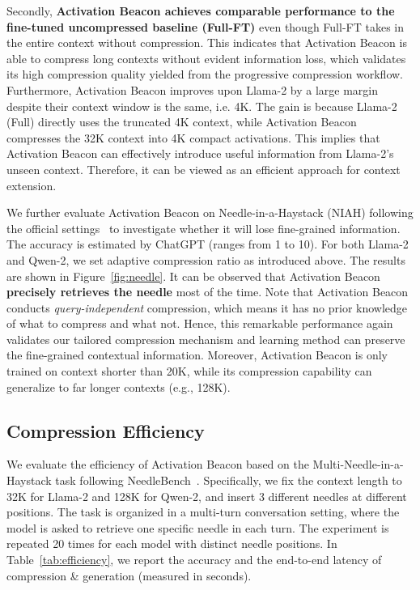 Secondly, \textbf{Activation Beacon achieves comparable performance to the fine-tuned uncompressed baseline (Full-FT)} even though Full-FT takes in the entire context without compression. This indicates that Activation Beacon is able to compress long contexts without evident information loss, which validates its high compression quality yielded from the progressive compression workflow. Furthermore, Activation Beacon improves upon Llama-2 by a large margin despite their context window is the same, i.e. 4K. The gain is because Llama-2 (Full) directly uses the truncated 4K context, while Activation Beacon compresses the 32K context into 4K compact activations. This implies that Activation Beacon can effectively introduce useful information from Llama-2's unseen context. Therefore, it can be viewed as an efficient approach for context extension.

We further evaluate Activation Beacon on Needle-in-a-Haystack (NIAH) following the official settings~\citep{niah} to investigate whether it will lose fine-grained information. The accuracy is estimated by ChatGPT (ranges from 1 to 10). For both Llama-2 and Qwen-2, we set adaptive compression ratio as introduced above. The results are shown in Figure~\ref{fig:needle}. It can be observed that Activation Beacon \textbf{precisely retrieves the needle} most of the time. Note that Activation Beacon conducts \textit{query-independent} compression, which means it has no prior knowledge of what to compress and what not. Hence, this remarkable performance again validates our tailored compression mechanism and learning method can preserve the fine-grained contextual information. Moreover, Activation Beacon is only trained on context shorter than 20K, while its compression capability can generalize to far longer contexts (e.g., 128K). 

\subsection{Compression Efficiency}
\label{sec:exp-efficiency}

We evaluate the efficiency of Activation Beacon based on the Multi-Needle-in-a-Haystack task following NeedleBench~\citep{li2024needlebench}. Specifically, we fix the context length to 32K for Llama-2 and 128K for Qwen-2, and insert 3 different needles at different positions. The task is organized in a multi-turn conversation setting, where the model is asked to retrieve one specific needle in each turn. The experiment is repeated 20 times for each model with distinct needle positions. In Table~\ref{tab:efficiency}, we report the accuracy and the end-to-end latency of compression \& generation (measured in seconds).

